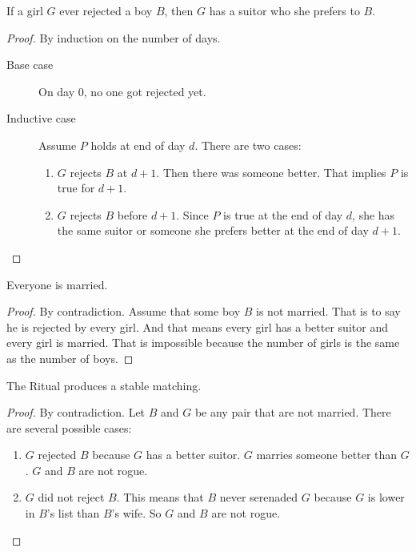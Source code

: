 \documentclass[11pt]{article}
\begin{document}
\begin{lemma}
If a girl $G$ ever rejected a boy $B$, then $G$ has a suitor who she prefers to $B$.
\end{lemma}

\begin{proof}
By induction on the number of days.

\begin{description}
\item[Base case] On day $0$, no one got rejected yet.
\item[Inductive case] Assume $P$ holds at end of day $d$. There are two cases:
\begin{enumerate}
\item $G$ rejects $B$ at $d+1$. Then there was someone better. That implies $P$ is true for $d+1$.
\item $G$ rejects $B$ before $d+1$. Since $P$ is true at the end of day $d$, she has the same suitor
or someone she prefers better at the end of day $d+1$.
\end{enumerate}
\end{description}
\end{proof}

\begin{theorem}
Everyone is married.
\end{theorem}

\begin{proof}
By contradiction. Assume that some boy $B$ is not married. That is to say he is rejected by every
girl. And that means every girl has a better suitor and every girl is married. That is impossible
because the number of girls is the same as the number of boys.
\end{proof}

\begin{theorem}
The Ritual produces a stable matching.
\end{theorem}

\begin{proof}
By contradiction. Let $B$ and $G$ be any pair that are not married. There are several possible cases:
\begin{enumerate}
\item $G$ rejected $B$ because $G$ has a better suitor. $G$ marries someone better than $G$. $G$ and
$B$ are not rogue.
\item $G$ did not reject $B$. This means that $B$ never serenaded $G$ because $G$ is lower in $B$'s
list than $B$'s wife. So $G$ and $B$ are not rogue.
\end{enumerate}
\end{proof}
\end{document}
